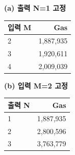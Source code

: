 \par\medskip\noindent
\begin{minipage}[t]{.49\linewidth}\centering
{\small\setlength{\tabcolsep}{3pt}\renewcommand{\arraystretch}{1.12}
\textbf{(a) 출력 N=1 고정}\par\smallskip
\begin{tabular}{@{}lr@{}}\toprule
\textbf{입력 M} & \textbf{Gas} \\
\midrule
2 & 1,887,935 \\
3 & 1,920,611 \\
4 & 2,009,039 \\
\bottomrule\end{tabular}}
\end{minipage}\hfill
\begin{minipage}[t]{.49\linewidth}\centering
{\small\setlength{\tabcolsep}{3pt}\renewcommand{\arraystretch}{1.12}
\textbf{(b) 입력 M=2 고정}\par\smallskip
\begin{tabular}{@{}lr@{}}\toprule
\textbf{출력 N} & \textbf{Gas} \\
\midrule
1 & 1,887,935 \\
2 & 2,800,596 \\
3 & 3,763,779 \\
\bottomrule\end{tabular}}
\end{minipage}
\par\medskip

